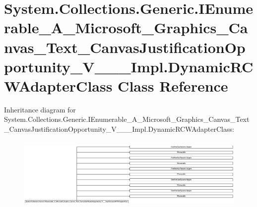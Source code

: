 \hypertarget{class_system_1_1_collections_1_1_generic_1_1_i_enumerable___a___microsoft___graphics___canvas___4a23f15626466fbf336291d85e168a16}{}\section{System.\+Collections.\+Generic.\+I\+Enumerable\+\_\+\+A\+\_\+\+Microsoft\+\_\+\+Graphics\+\_\+\+Canvas\+\_\+\+Text\+\_\+\+Canvas\+Justification\+Opportunity\+\_\+\+V\+\_\+\+\_\+\+\_\+\+Impl.\+Dynamic\+R\+C\+W\+Adapter\+Class Class Reference}
\label{class_system_1_1_collections_1_1_generic_1_1_i_enumerable___a___microsoft___graphics___canvas___4a23f15626466fbf336291d85e168a16}
Inheritance diagram for System.\+Collections.\+Generic.\+I\+Enumerable\+\_\+\+A\+\_\+\+Microsoft\+\_\+\+Graphics\+\_\+\+Canvas\+\_\+\+Text\+\_\+\+Canvas\+Justification\+Opportunity\+\_\+\+V\+\_\+\+\_\+\+\_\+\+Impl.\+Dynamic\+R\+C\+W\+Adapter\+Class\+:\begin{figure}[H]
\begin{center}
\leavevmode
\includegraphics[height=3.573086cm]{class_system_1_1_collections_1_1_generic_1_1_i_enumerable___a___microsoft___graphics___canvas___4a23f15626466fbf336291d85e168a16}
\end{center}
\end{figure}

